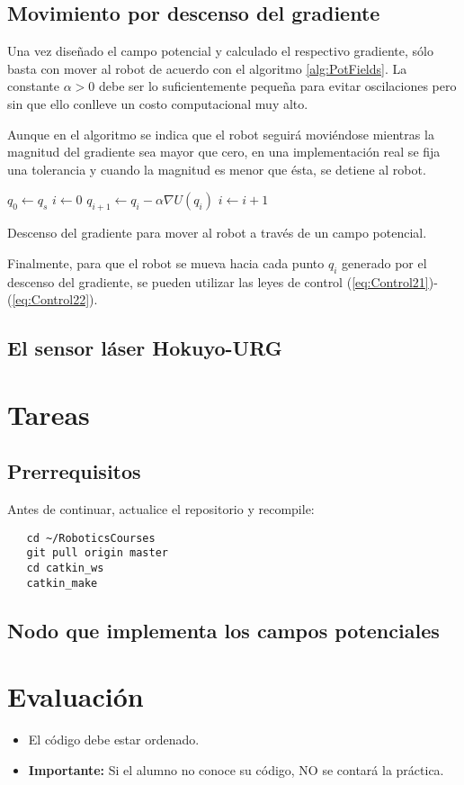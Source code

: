 \documentclass[letterpaper,12pt]{article}
\begin{document}
\subsection{Movimiento por descenso del gradiente}
Una vez diseñado el campo potencial y calculado el respectivo gradiente, sólo basta con mover al robot de acuerdo con el algoritmo \ref{alg:PotFields}. La constante $\alpha > 0$ debe ser lo suficientemente pequeña para evitar oscilaciones pero sin que ello conlleve un costo computacional muy alto. 

Aunque en el algoritmo se indica que el robot seguirá moviéndose mientras la magnitud del gradiente sea mayor que cero, en una implementación real se fija una tolerancia y cuando la magnitud es menor que ésta, se detiene al robot. 
\begin{algorithm}
\DontPrintSemicolon
{}
$q_0 \leftarrow q_s$\;
$i \leftarrow 0$\;
{
  $q_{i+1} \leftarrow q_i - \alpha\nabla U(q_i)$\;
  $i \leftarrow i + 1$
}
  \caption{Descenso del gradiente para mover al robot a través de un campo potencial.}
  \label{alg:PotFields}
\end{algorithm}

Finalmente, para que el robot se mueva hacia cada punto $q_i$ generado por el descenso del gradiente, se pueden utilizar las leyes de control (\ref{eq:Control21})-(\ref{eq:Control22}).

\subsection{El sensor láser Hokuyo-URG}

\section{Tareas}

\subsection{Prerrequisitos}
Antes de continuar, actualice el repositorio y recompile:
\begin{verbatim}
   cd ~/RoboticsCourses
   git pull origin master
   cd catkin_ws
   catkin_make
\end{verbatim}


\subsection{Nodo que implementa los campos potenciales}

\section{Evaluación}
\begin{itemize}
\item El código debe estar ordenado.
\item \textbf{Importante: } Si el alumno no conoce su código, NO se contará la práctica.
\end{itemize}
\end{document}
